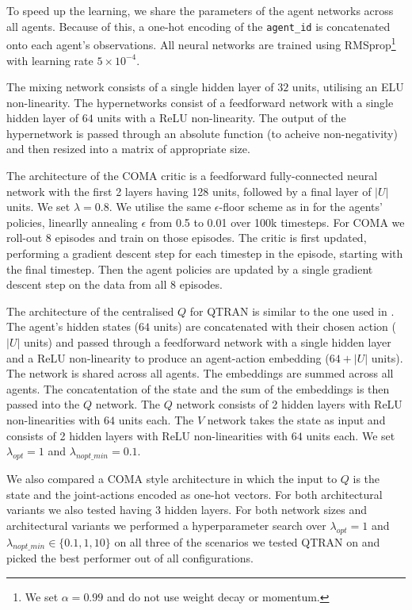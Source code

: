 \documentclass[twoside,11pt]{article}
\begin{document}
To speed up the learning, we share the parameters of the agent networks across all agents. 
Because of this, a one-hot encoding of the \texttt{agent\_id} is concatenated onto each agent's observations. 
All neural networks are trained using RMSprop\footnote{We set $\alpha = 0.99$ and do not use weight decay or momentum.} with learning rate $5 \times 10^{-4}$. 

The mixing network consists of a single hidden layer of $32$ units, utilising an ELU non-linearity. 
The hypernetworks consist of a feedforward network with a single hidden layer of $64$ units with a ReLU non-linearity. 
The output of the hypernetwork is passed through an absolute function (to acheive non-negativity) and then resized into a matrix of appropriate size.

The architecture of the COMA critic is a feedforward fully-connected neural network with the first 2 layers having 128 units, followed by a final layer of $|U|$ units. We set $\lambda=0.8$. 
We utilise the same $\epsilon$-floor scheme as in \citep{foerster_counterfactual_2017} for the agents’ policies, linearlly annealing $\epsilon$ from 0.5 to 0.01 over 100k timesteps.
For COMA we roll-out 8 episodes and train on those episodes.
The critic is first updated, performing a gradient descent step for each timestep in the episode, starting with the final timestep.
Then the agent policies are updated by a single gradient descent step on the data from all 8 episodes.

The architecture of the centralised $Q$ for QTRAN is similar to the one used in \citep{son_qtran:_2019}.
The agent's hidden states ($64$ units) are concatenated with their chosen action ($|U|$ units) and passed through a feedforward network with a single hidden layer and a ReLU non-linearity to produce an agent-action embedding ($64 + |U|$ units). The network is shared across all agents. The embeddings are summed across all agents.
The concatentation of the state and the sum of the embeddings is then passed into the $Q$ network.
The $Q$ network consists of 2 hidden layers with ReLU non-linearities with $64$ units each.
The $V$ network takes the state as input and consists of 2 hidden layers with ReLU non-linearities with $64$ units each.
We set $\lambda_{opt}=1$ and $\lambda_{nopt\_min}=0.1$.

We also compared a COMA style architecture in which the input to $Q$ is the state and the joint-actions encoded as one-hot vectors.
For both architectural variants we also tested having 3 hidden layers.
For both network sizes and architectural variants we performed a hyperparameter search over $\lambda_{opt}=1$ and $\lambda_{nopt\_min} \in \{0.1,1,10\}$ on all three of the scenarios we tested QTRAN on and picked the best performer out of all configurations.
\end{document}
